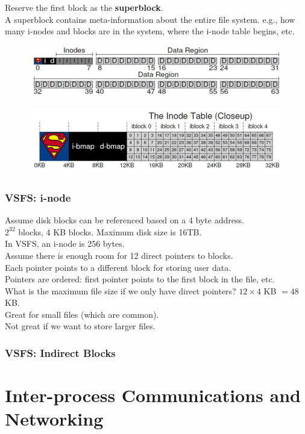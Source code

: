 \documentclass[12pt]{article}
\theoremstyle{plain}
\theoremstyle{definition}
\begin{document}
Reserve the first block as the \textbf{superblock}. \\
A superblock contains meta-information about the entire file system.
e.g., how many i-nodes and blocks are in the system, where the i-node table begins, etc.
\begin{figure}[H]
  \centering
  \includegraphics[scale=0.8]{pictures/vsfs_4.png}
\end{figure}
\begin{figure}[H]
  \vspace{-20pt}
  \centering
  \includegraphics[scale=0.8]{pictures/vsfs_5.png}
\end{figure}

\subsubsection{VSFS: i-node}
Assume disk blocks can be referenced based on a 4 byte address. \\
$2^{32}$ blocks, 4 KB blocks.
Maximum disk size is 16TB. \\

In VSFS, an i-node is 256 bytes. \\
Assume there is enough room for 12 direct pointers to blocks. \\
Each pointer points to a different block for storing user data. \\
Pointers are ordered: first pointer points to the first block in the file, etc. \\

What is the maximum file size if we only have direct pointers? $12 \times 4$ KB $= 48$ KB. \\
Great for small files (which are common). \\
Not great if we want to store larger files.

\subsubsection{VSFS: Indirect Blocks}


\newpage
\section{Inter-process Communications and Networking}

\clearpage
\printindex
\end{document}
